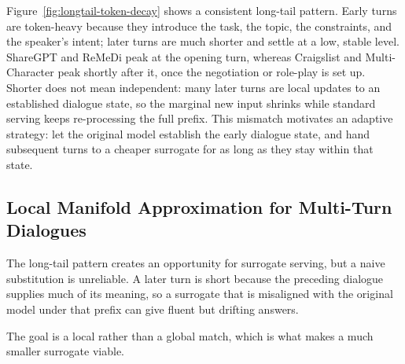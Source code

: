 Figure~\ref{fig:longtail-token-decay} shows a consistent long-tail pattern. Early turns are token-heavy because they introduce the task, the topic, the constraints, and the speaker's intent; later turns are much shorter and settle at a low, stable level. ShareGPT and ReMeDi peak at the opening turn, whereas Craigslist and Multi-Character peak shortly after it, once the negotiation or role-play is set up. Shorter does not mean independent: many later turns are local updates to an established dialogue state, so the marginal new input shrinks while standard serving keeps re-processing the full prefix. This mismatch motivates an adaptive strategy: let the original model establish the early dialogue state, and hand subsequent turns to a cheaper surrogate for as long as they stay within that state.

\subsection{Local Manifold Approximation for Multi-Turn Dialogues}

The long-tail pattern creates an opportunity for surrogate serving, but a naive substitution is unreliable. A later turn is short because the preceding dialogue supplies much of its meaning, so a surrogate that is misaligned with the original model under that prefix can give fluent but drifting answers.

 The goal is a local rather than a global match, which is what makes a much smaller surrogate viable.

\begin{problem}\label{prob:lma}
\end{problem}

